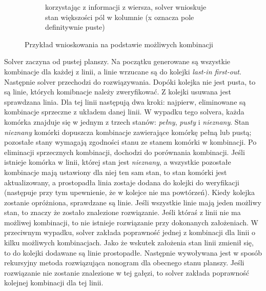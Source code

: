 \begin{figure}[!htb]
\begin{subfigure}[b]{0.35\textwidth}
        \caption{korzystając z informacji z wiersza, solver wnioskuje stan większości pól w kolumnie
        (x oznacza pole definitywnie puste)}
    \end{subfigure}
    \caption{Przykład wnioskowania na podstawie możliwych kombinacji}
\end{figure}

    Solver zaczyna od pustej planszy. Na początku generowane są wszystkie kombinacje dla każdej z
linii, a linie wrzucane są do kolejki \textit{last-in first-out}. Następnie solver przechodzi do
rozwiązywania. Dopóki kolejka nie jest pusta, to są linie, których komibnacje należy zweryfikować.
Z kolejki usuwana jest sprawdzana linia. Dla tej linii następują dwa kroki: najpierw, eliminowane
są kombinacje sprzeczne z układem danej linii. W wypadku tego solvera, każda komórka znajduje się
w jednym z trzech stanów: \textit{pełny}, \textit{pusty} i \textit{nieznany}. Stan \textit{nieznany}
komórki dopuszcza kombinacje zawierające komórkę pełną lub pustą; pozostałe stany wymagają
zgodności stanu ze stanem komórki w kombinacji. Po eliminacji sprzecznych kombinacji, dochodzi
do porównania kombinacji. Jeśli istnieje komórka w linii, której stan jest \textit{nieznany}, a
wszystkie pozostałe kombinacje mają ustawiony dla niej ten sam stan, to stan komórki jest aktualizowany,
a prostopadła linia zostaje dodana do kolejki do weryfikacji (następuje przy tym upewnienie, że
w kolejce nie ma powtórzeń). Kiedy kolejka zostanie opróżniona, sprawdzane są linie.
Jeśli wszystkie linie mają jeden możliwy stan, to znaczy że zostało znalezione rozwiązanie. Jeśli
któraś z linii nie ma możliwej kombinacji, to nie istnieje rozwiązanie przy dokonanych założeniach.
W przeciwnym wypadku, solver zakłada poprawność jednej z kombinacji dla linii
o kilku możliwych kombinacjach. Jako że wskutek założenia stan linii zmienił się, to do kolejki
dodawane są linie prostopadłe. Następnie wywoływana jest w sposób rekursyjny metoda rozwiązująca
nonogram dla obecnego stanu planszy. Jeśli rozwiązanie nie zostanie znalezione w tej gałęzi, to
solver zakłada poprawność kolejnej kombinacji dla tej linii.

